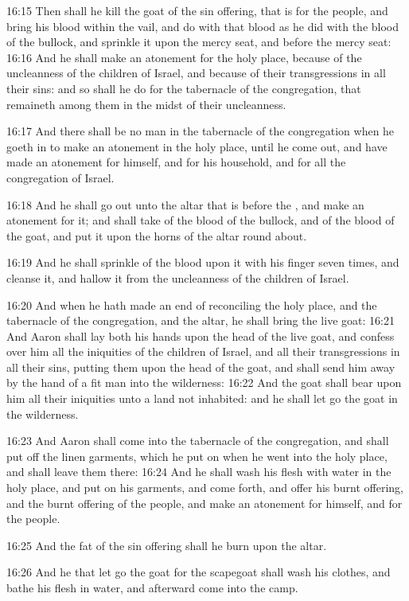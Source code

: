 16:15 Then shall he kill the goat of the sin offering, that is for the people, and bring his blood within the vail, and do with that blood as he did with the blood of the bullock, and sprinkle it upon the mercy seat, and before the mercy seat: 16:16 And he shall make an atonement for the holy place, because of the uncleanness of the children of Israel, and because of their transgressions in all their sins: and so shall he do for the tabernacle of the congregation, that remaineth among them in the midst of their uncleanness.

16:17 And there shall be no man in the tabernacle of the congregation when he goeth in to make an atonement in the holy place, until he come out, and have made an atonement for himself, and for his household, and for all the congregation of Israel.

16:18 And he shall go out unto the altar that is before the \LORD, and make an atonement for it; and shall take of the blood of the bullock, and of the blood of the goat, and put it upon the horns of the altar round about.

16:19 And he shall sprinkle of the blood upon it with his finger seven times, and cleanse it, and hallow it from the uncleanness of the children of Israel.

16:20 And when he hath made an end of reconciling the holy place, and the tabernacle of the congregation, and the altar, he shall bring the live goat: 16:21 And Aaron shall lay both his hands upon the head of the live goat, and confess over him all the iniquities of the children of Israel, and all their transgressions in all their sins, putting them upon the head of the goat, and shall send him away by the hand of a fit man into the wilderness: 16:22 And the goat shall bear upon him all their iniquities unto a land not inhabited: and he shall let go the goat in the wilderness.

16:23 And Aaron shall come into the tabernacle of the congregation, and shall put off the linen garments, which he put on when he went into the holy place, and shall leave them there: 16:24 And he shall wash his flesh with water in the holy place, and put on his garments, and come forth, and offer his burnt offering, and the burnt offering of the people, and make an atonement for himself, and for the people.

16:25 And the fat of the sin offering shall he burn upon the altar.

16:26 And he that let go the goat for the scapegoat shall wash his clothes, and bathe his flesh in water, and afterward come into the camp.

